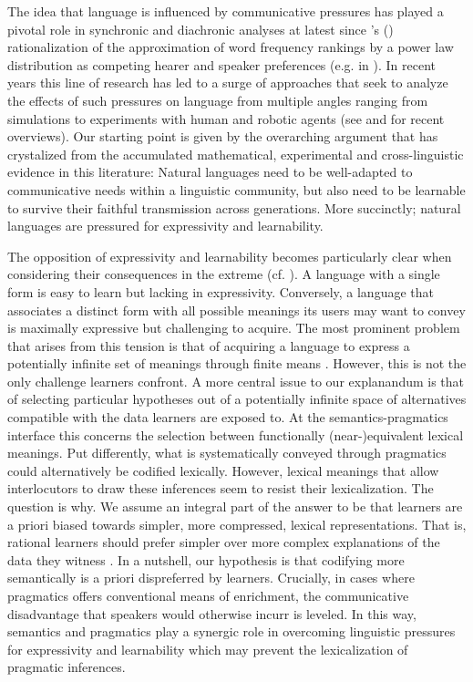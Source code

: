 \documentclass[a4paper]{article}
\newcommand{\citeposs}[2][]{\citeauthor{#2}'s (\citeyear[#1]{#2})}
\begin{document}
The idea that language is influenced by communicative pressures has played a pivotal role in synchronic and diachronic analyses at latest since \citeposs{zipf:1949} rationalization of the approximation of word frequency rankings by a power law distribution as competing hearer and speaker preferences (e.g. in \citealt{martinet:1962, horn:1984,jaeger+vRooij:2007,jaeger:2007, piantadosi:2014,kirby+etal:2015}). In recent years this line of research has led to a surge of approaches that seek to analyze the effects of such pressures on language from multiple angles ranging from simulations to experiments with human and robotic agents (see \citealt{steels:2015} and \citealt{tamariz+kirby:2016} for recent overviews). Our starting point is given by the overarching argument that has crystalized from the accumulated mathematical, experimental and cross-linguistic evidence in this literature: Natural languages need to be well-adapted to communicative needs within a linguistic community, but also need to be learnable to survive their faithful transmission across generations. More succinctly; natural languages are pressured for expressivity and learnability.   

The opposition of expressivity and learnability becomes particularly clear when considering their consequences in the extreme (cf. \citealt{kemp+regier:2012,kirby+etal:2015}). A language with a single form is easy to learn but lacking in expressivity. Conversely, a language that associates a distinct form with all possible meanings its users may want to convey is maximally expressive but challenging to acquire. The most prominent problem that arises from this tension is that of acquiring a language to express a potentially infinite set of meanings through finite means \citep{kirby:2002}. However, this is not the only challenge learners confront. A more central issue to our explanandum is that of selecting particular hypotheses out of a potentially infinite space of alternatives compatible with the data learners are exposed to. At the semantics-pragmatics interface this concerns the selection between functionally (near-)equivalent lexical meanings. Put differently, what is systematically conveyed through pragmatics could alternatively be codified lexically. However, lexical meanings that allow interlocutors to draw these inferences seem to resist their lexicalization. The question is why. We assume an integral part of the answer to be that learners are a priori biased towards simpler, more compressed, lexical representations. That is, rational learners should prefer simpler over more complex explanations of the data they witness \citep{feldman:2000, chater+vitanyi:2003, piantadosi+etal:2012a, kirby+etal:2015,piantadosi+etal:underreview}. In a nutshell, our hypothesis is that codifying more semantically is a priori dispreferred by learners. Crucially, in cases where pragmatics offers conventional means of enrichment, the communicative disadvantage that speakers would otherwise incurr is leveled. In this way, semantics and pragmatics play a synergic role in overcoming linguistic pressures for expressivity and learnability which may prevent the lexicalization of pragmatic inferences.  
\end{document}

